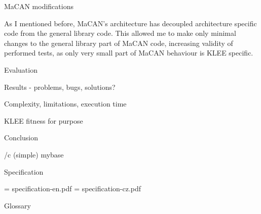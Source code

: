 \sec MaCAN modifications

As I mentioned before, MaCAN's architecture has decoupled architecture specific
code from the general library code. This allowed me to make only minimal
changes to the general library part of MaCAN code, increasing validity of
performed tests, as only very small part of MaCAN behaviour is KLEE specific.


\chap Evaluation

\sec Results - problems, bugs, solutions?


\sec Complexity, limitations, execution time

\sec KLEE fitness for purpose

\chap Conclusion



\bibchap
\usebib/c (simple) mybase


\app Specification

\picw=\hsize
\cinspic specification-en.pdf
\vfil\break
\picw=\hsize
\cinspic specification-cz.pdf

\nextoddpage


\app Glossary\par
\makeglos

\nextoddpage

\bye

